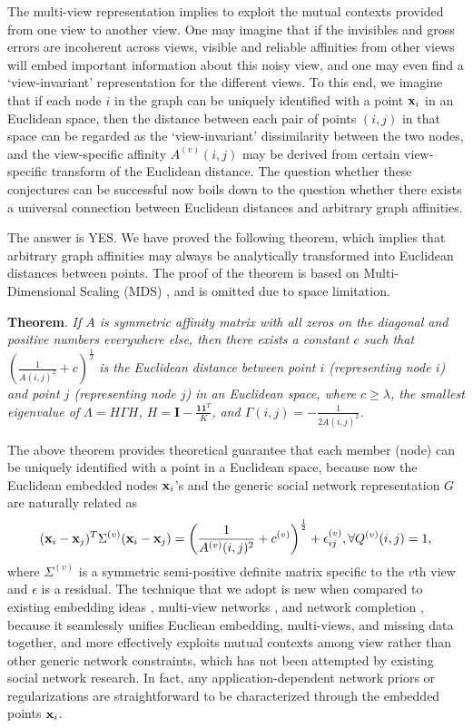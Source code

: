 The multi-view representation implies to exploit the mutual contexts provided from one view to another view. One may imagine that if the invisibles and gross errors are incoherent across views, visible and reliable affinities from other views will embed important information about this noisy view, and one may even find a `view-invariant' representation for the different views. To this end, we imagine that if each node $i$ in the graph can be uniquely identified with a point ${\bf x}_i$ in an Euclidean space, then the distance between each pair of points $(i,j)$ in that space can be regarded as the `view-invariant' dissimilarity between the two nodes, and the view-specific affinity $A^{(v)}(i,j)$ may be derived from certain view-specific transform of the Euclidean distance. The question whether these conjectures can be successful now boils down to the question whether there exists a universal connection between Euclidean distances and arbitrary graph affinities.

The answer is YES. We have proved the following theorem, which implies that arbitrary graph affinities may always be analytically transformed into Euclidean distances between points. The proof of the theorem is based on Multi-Dimensional Scaling (MDS) \cite{CoxMDS}, and is omitted due to space limitation.

\vspace{5pt}
\textbf{Theorem}. \textit{If $A$ is symmetric affinity matrix with all zeros on the diagonal and positive numbers everywhere else, then there exists a constant $c$ such that $(\frac{1}{A(i,j)^2}+c)^{\frac{1}{2}}$ is the Euclidean distance between point $i$ (representing node $i$) and point $j$ (representing node $j$) in an Euclidean space, where $c\geq\lambda$, the smallest eigenvalue of $\Lambda=H\Gamma H$, $H=\mathbf{I}-\frac{\mathbf{1}\mathbf{1}^T}{K}$, and $\Gamma(i,j)=-\frac{1}{2A(i,j)^2}$.} 
\vspace{5pt}


The above theorem provides theoretical guarantee that each member (node) can be uniquely identified with a point in a Euclidean space, because now the Euclidean embedded nodes ${\bf x}_i$'s and the generic social network representation $G$ are naturally related as
\begin{equation}\label{eq:embed}
({\bf x}_i-{\bf x}_j)^{T}\Sigma^{(v)}({\bf x}_i-{\bf x}_j)=\left(\frac{1}{A^{(v)}(i,j)^2}+c^{(v)}\right)^{\frac{1}{2}}+\epsilon^{(v)}_{ij}, \forall Q^{(v)}(i,j)=1,
\end{equation}
where $\Sigma^{(v)}$ is a symmetric semi-positive definite matrix specific to the $v$th view and $\epsilon$ is a residual. The technique that we adopt is new when compared to existing embedding ideas \cite{Hoff01latentspace,Hancocklatent}, multi-view networks \cite{AiroldiBFX08,Kim12}, and network completion \cite{Clauset,Guimera,HannekeX09,KimL11}, because it seamlessly unifies Eucliean embedding, multi-views, and missing data together, and more effectively exploits mutual contexts among view rather than other generic network constraints, which has not been attempted by existing social network research. In fact, any application-dependent network priors or regularizations are straightforward to be characterized through the embedded points ${\bf x}_i$. 


